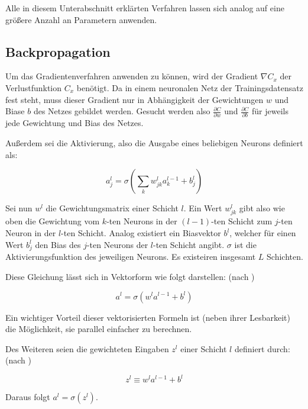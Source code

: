 Alle in diesem Unterabschnitt erklärten Verfahren lassen sich analog auf eine größere Anzahl an Parametern anwenden.

\subsection{Backpropagation}
\label{sec:backpropagation}

Um das Gradientenverfahren anwenden zu können, wird der Gradient $\nabla C_x$ der Verlustfunktion $C_x$ benötigt. Da in einem neuronalen Netz der Trainingsdatensatz fest steht, muss dieser Gradient nur in Abhängigkeit der Gewichtungen $w$ und Biase $b$ des Netzes gebildet werden. Gesucht werden also $\frac{\partial C}{\partial w}$ und $\frac{\partial C}{\partial b}$ für jeweils jede Gewichtung und Bias des Netzes.

Außerdem sei die Aktivierung, also die Ausgabe eines beliebigen Neurons definiert als: \cite[Kap.~2]{nielsen_15}

\begin{equation}
a_j^l = \sigma\left(\sum_k w_{jk}^l a_k^{l-1}+b_j^l\right)
\end{equation}

Sei nun $w^l$ die Gewichtungsmatrix einer Schicht $l$. Ein Wert $w_{jk}^l$ gibt also wie oben die Gewichtung vom $k$-ten Neurons in der $\left(l-1\right)$-ten Schicht zum $j$-ten Neuron in der $l$-ten Schicht. Analog existiert ein Biasvektor $b^l$, welcher für einen Wert $b_j^l$ den Bias des $j$-ten Neurons der $l$-ten Schicht angibt. $\sigma$ ist die Aktivierungsfunktion des jeweiligen Neurons. Es existeiren insgesamt $L$ Schichten.

Diese Gleichung lässt sich in Vektorform wie folgt darstellen: (nach \cite[Kap.~2]{nielsen_15})

\begin{equation}
a^l = \sigma\left(w^l a^{l-1}+b^l\right)
\end{equation}

Ein wichtiger Vorteil dieser vektorisierten Formeln ist (neben ihrer Lesbarkeit) die Möglichkeit, sie parallel einfacher zu berechnen.

Des Weiteren seien die gewichteten Eingaben $z^l$ einer Schicht $l$ definiert durch: (nach \cite[Kap.~2]{nielsen_15})

\begin{equation}
z^l \equiv w^l a^{l-1} + b^l
\end{equation}

Daraus folgt $a^l=\sigma\left(z^l\right)$.

